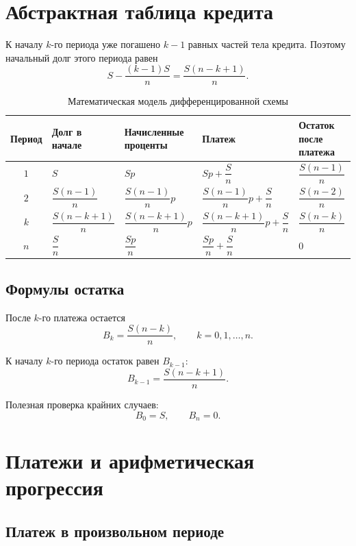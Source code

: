 \documentclass[a4paper,12pt]{article}
\begin{document}
\section{Абстрактная таблица кредита}

К началу $k$-го периода уже погашено $k-1$ равных частей тела кредита.
Поэтому начальный долг этого периода равен
\[
S-\frac{(k-1)S}{n}
=
\frac{S(n-k+1)}{n}.
\]

\begin{table}[ht]
\centering
\caption{Математическая модель дифференцированной схемы}
\small
\begin{tabularx}{\linewidth}{@{}cYYYY@{}}
\toprule
Период
&
Долг в начале
&
Начисленные проценты
&
Платеж
&
Остаток после платежа
\\
\midrule
$1$
&
$S$
&
$Sp$
&
$Sp+\dfrac{S}{n}$
&
$\dfrac{S(n-1)}{n}$
\\[2mm]

$2$
&
$\dfrac{S(n-1)}{n}$
&
$\dfrac{S(n-1)}{n}p$
&
$\dfrac{S(n-1)}{n}p+\dfrac{S}{n}$
&
$\dfrac{S(n-2)}{n}$
\\[2mm]

$k$
&
$\dfrac{S(n-k+1)}{n}$
&
$\dfrac{S(n-k+1)}{n}p$
&
$\dfrac{S(n-k+1)}{n}p+\dfrac{S}{n}$
&
$\dfrac{S(n-k)}{n}$
\\[2mm]

$n$
&
$\dfrac{S}{n}$
&
$\dfrac{Sp}{n}$
&
$\dfrac{Sp}{n}+\dfrac{S}{n}$
&
$0$
\\
\bottomrule
\end{tabularx}
\end{table}

\subsection{Формулы остатка}

После $k$-го платежа остается
\[
\boxed{B_k=\frac{S(n-k)}{n}},
\qquad
k=0,1,\ldots,n.
\]

К началу $k$-го периода остаток равен $B_{k-1}$:
\[
\boxed{B_{k-1}=\frac{S(n-k+1)}{n}}.
\]

Полезная проверка крайних случаев:
\[
B_0=S,
\qquad
B_n=0.
\]

\section{Платежи и арифметическая прогрессия}

\subsection{Платеж в произвольном периоде}
\end{document}
